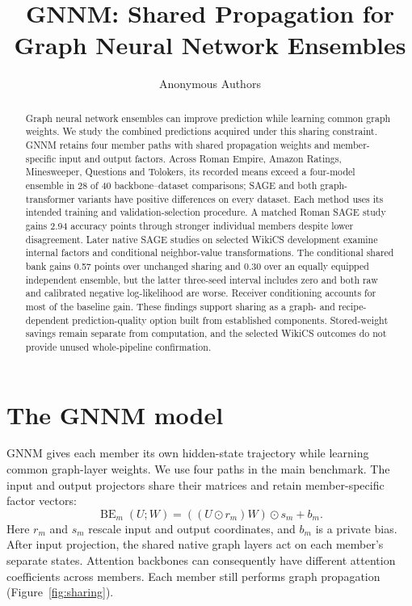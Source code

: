 \documentclass{article}
\title{GNNM: Shared Propagation for Graph Neural Network Ensembles}
\author{Anonymous Authors}
\begin{document}
\maketitle

\begin{abstract}
Graph neural network ensembles can improve prediction while learning common graph weights. We study the combined predictions acquired under this sharing constraint. GNNM retains four member paths with shared propagation weights and member-specific input and output factors. Across Roman Empire, Amazon Ratings, Minesweeper, Questions and Tolokers, its recorded means exceed a four-model ensemble in 28 of 40 backbone--dataset comparisons; SAGE and both graph-transformer variants have positive differences on every dataset. Each method uses its intended training and validation-selection procedure. A matched Roman SAGE study gains 2.94 accuracy points through stronger individual members despite lower disagreement. Later native SAGE studies on selected WikiCS development examine internal factors and conditional neighbor-value transformations. The conditional shared bank gains 0.57 points over unchanged sharing and 0.30 over an equally equipped independent ensemble, but the latter three-seed interval includes zero and both raw and calibrated negative log-likelihood are worse. Receiver conditioning accounts for most of the baseline gain. These findings support sharing as a graph- and recipe-dependent prediction-quality option built from established components. Stored-weight savings remain separate from computation, and the selected WikiCS outcomes do not provide unused whole-pipeline confirmation.
\end{abstract}



\section{The GNNM model}\label{sec:method}
GNNM gives each member its own hidden-state trajectory while learning common graph-layer weights. We use four paths in the main benchmark. The input and output projectors share their matrices and retain member-specific factor vectors:
\begin{equation}\label{eq:be}
\operatorname{BE}_m(U;W)=((U\odot r_m)W)\odot s_m+b_m.
\end{equation}
Here $r_m$ and $s_m$ rescale input and output coordinates, and $b_m$ is a private bias. After input projection, the shared native graph layers act on each member's separate states. Attention backbones can consequently have different attention coefficients across members. Each member still performs graph propagation (Figure~\ref{fig:sharing}).
\end{document}
